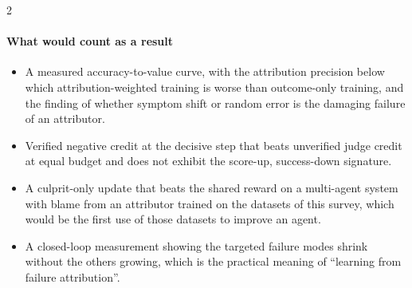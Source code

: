 \begin{multicols}{2}
\paragraph{What would count as a result}
\begin{itemize}[leftmargin=1.1em]
\item A measured accuracy-to-value curve, with the attribution precision below which attribution-weighted training is worse than outcome-only training, and the finding of whether symptom shift or random error is the damaging failure of an attributor.
\item Verified negative credit at the decisive step that beats unverified judge credit at equal budget and does not exhibit the score-up, success-down signature.
\item A culprit-only update that beats the shared reward on a multi-agent system with blame from an attributor trained on the datasets of this survey, which would be the first use of those datasets to improve an agent.
\item A closed-loop measurement showing the targeted failure modes shrink without the others growing, which is the practical meaning of ``learning from failure attribution''.
\end{itemize}
\end{multicols}
